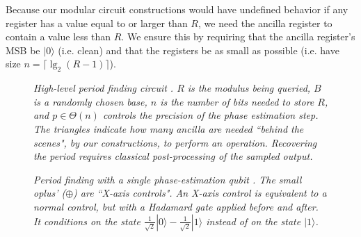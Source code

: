 \documentclass[twocolumn]{article}
\begin{document}
Because our modular circuit constructions would have undefined behavior if any register has a value equal to or larger than $R$, we need the ancilla register to contain a value less than $R$.
We ensure this by requiring that the ancilla register's MSB be $|0\rangle$ (i.e. clean) and that the registers be as small as possible (i.e. have size $n = \lceil \lg_2(R-1) \rceil$).

\begin{figure}
  \centering
  \caption{\em
	High-level period finding circuit \cite{Shor1999}.
	$R$ is the modulus being queried, $B$ is a randomly chosen base, $n$ is the number of bits needed to store $R$, and $p \in \Theta(n)$ controls the precision of the phase estimation step.
    The triangles indicate how many ancilla are needed ``behind the scenes", by our constructions, to perform an operation.
	Recovering the period requires classical post-processing of the sampled output.
  }
  \label{fig:period-finding}
\end{figure}

\begin{figure}
  \centering
  \caption{\em
	Period finding with a single phase-estimation qubit \cite{beauregard2003}.
	The small oplus' ({\tiny $\oplus$}) are ``X-axis controls".
	An X-axis control is equivalent to a normal control, but with a Hadamard gate applied before and after.
	It conditions on the state $\frac{1}{\sqrt 2}|0\rangle - \frac{1}{\sqrt 2}|1\rangle$ instead of on the state $|1\rangle$.
  }
  \label{fig:period-finding-solo-phase-qubit}
\end{figure}
\end{document}
